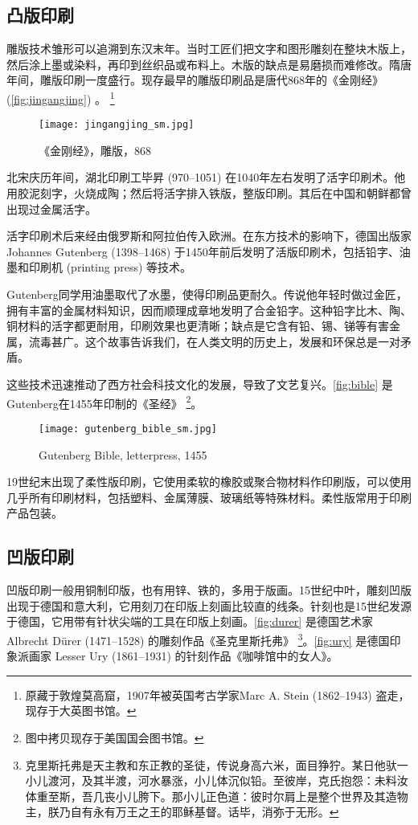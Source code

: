\subsection{凸版印刷}

雕版技术雏形可以追溯到东汉末年。当时工匠们把文字和图形雕刻在整块木版上，然后涂上墨或染料，再印到丝织品或布料上。木版的缺点是易磨损而难修改。隋唐年间，雕版印刷一度盛行。现存最早的雕版印刷品是唐代868年的《金刚经》 (\autoref{fig:jingangjing}) 。 \footnote{原藏于敦煌莫高窟，1907年被英国考古学家Marc A. Stein (1862--1943) 盗走，现存于大英图书馆。}

\begin{figure}[htbp]
\centering
\texttt{[image: jingangjing\_sm.jpg]}
\caption{《金刚经》，雕版，868}
\label{fig:jingangjing}
\end{figure}

北宋庆历年间，湖北印刷工毕昇 (970--1051)\indexBiSheng{} 在1040年左右发明了活字印刷术。他用胶泥刻字，火烧成陶；然后将活字排入铁版，整版印刷。其后在中国和朝鲜都曾出现过金属活字。

活字印刷术后来经由俄罗斯和阿拉伯传入欧洲。在东方技术的影响下，德国出版家Johannes Gutenberg (1398--1468)\indexGutenberg{} 于1450年前后发明了活版印刷术，包括铅字、油墨和印刷机 (printing press) 等技术。

Gutenberg同学用油墨取代了水墨，使得印刷品更耐久。传说他年轻时做过金匠，拥有丰富的金属材料知识，因而顺理成章地发明了合金铅字。这种铅字比木、陶、铜材料的活字都更耐用，印刷效果也更清晰；缺点是它含有铅、锡、锑等有害金属，流毒甚广。这个故事告诉我们，在人类文明的历史上，发展和环保总是一对矛盾。

这些技术迅速推动了西方社会科技文化的发展，导致了文艺复兴。\autoref{fig:bible} 是Gutenberg在1455年印制的《圣经》 \footnote{图中拷贝现存于美国国会图书馆。}。

\begin{figure}[htbp]
\centering
\texttt{[image: gutenberg\_bible\_sm.jpg]}
\caption{Gutenberg Bible, letterpress, 1455}
\label{fig:bible}
\end{figure}

19世纪末出现了柔性版印刷，它使用柔软的橡胶或聚合物材料作印刷版，可以使用几乎所有印刷材料，包括塑料、金属薄膜、玻璃纸等特殊材料。柔性版常用于印刷产品包装。

\subsection{凹版印刷}

凹版印刷一般用铜制印版，也有用锌、铁的，多用于版画。15世纪中叶，雕刻凹版出现于德国和意大利，它用刻刀在印版上刻画比较直的线条。针刻也是15世纪发源于德国，它用带有针状尖端的工具在印版上刻画。\autoref{fig:durer} 是德国艺术家 Albrecht Dürer (1471--1528)\indexDurer{} 的雕刻作品《圣克里斯托弗》 \footnote{克里斯托弗是天主教和东正教的圣徒，传说身高六米，面目狰狞。某日他驮一小儿渡河，及其半渡，河水暴涨，小儿体沉似铅。至彼岸，克氏抱怨：未料汝体重至斯，吾几丧小儿胯下。那小儿正色道：彼时尔肩上是整个世界及其造物主，朕乃自有永有万王之王的耶稣基督。话毕，消弥于无形。}。\autoref{fig:ury} 是德国印象派画家 Lesser Ury (1861--1931)\indexUry{} 的针刻作品《咖啡馆中的女人》。

